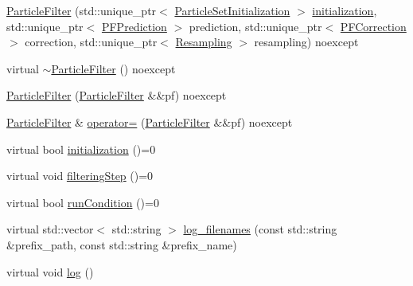 \begin{DoxyCompactItemize}
\item 
\mbox{\hyperlink{classbfl_1_1ParticleFilter_a849f01a7651c350438c31bf364ef59c3}{Particle\+Filter}} (std\+::unique\+\_\+ptr$<$ \mbox{\hyperlink{classbfl_1_1ParticleSetInitialization}{Particle\+Set\+Initialization}} $>$ \mbox{\hyperlink{classbfl_1_1FilteringAlgorithm_adebe2ec2372f97a2a5baecf8c2c2a9c9}{initialization}}, std\+::unique\+\_\+ptr$<$ \mbox{\hyperlink{classbfl_1_1PFPrediction}{P\+F\+Prediction}} $>$ prediction, std\+::unique\+\_\+ptr$<$ \mbox{\hyperlink{classbfl_1_1PFCorrection}{P\+F\+Correction}} $>$ correction, std\+::unique\+\_\+ptr$<$ \mbox{\hyperlink{classbfl_1_1Resampling}{Resampling}} $>$ resampling) noexcept
\item 
virtual \mbox{\hyperlink{classbfl_1_1ParticleFilter_a11dcf55dd8fa9f246c2af2bf6decbaa3}{$\sim$\+Particle\+Filter}} () noexcept
\item 
\mbox{\hyperlink{classbfl_1_1ParticleFilter_a957e97f5ea94684b0b33f7f4511b29e5}{Particle\+Filter}} (\mbox{\hyperlink{classbfl_1_1ParticleFilter}{Particle\+Filter}} \&\&pf) noexcept
\item 
\mbox{\hyperlink{classbfl_1_1ParticleFilter}{Particle\+Filter}} \& \mbox{\hyperlink{classbfl_1_1ParticleFilter_af8a15189f6426c075236dd5e9c9a3107}{operator=}} (\mbox{\hyperlink{classbfl_1_1ParticleFilter}{Particle\+Filter}} \&\&pf) noexcept
\item 
virtual bool \mbox{\hyperlink{classbfl_1_1FilteringAlgorithm_adebe2ec2372f97a2a5baecf8c2c2a9c9}{initialization}} ()=0
\item 
virtual void \mbox{\hyperlink{classbfl_1_1FilteringAlgorithm_ab3bceb43b5810a4bf1da884b8a0b145a}{filtering\+Step}} ()=0
\item 
virtual bool \mbox{\hyperlink{classbfl_1_1FilteringAlgorithm_a5fc12882356f6906b102fbfff2bc4b7c}{run\+Condition}} ()=0
\item 
virtual std\+::vector$<$ std\+::string $>$ \mbox{\hyperlink{classbfl_1_1Logger_a328ceaa8e70e6918f11142b12b8be217}{log\+\_\+filenames}} (const std\+::string \&prefix\+\_\+path, const std\+::string \&prefix\+\_\+name)
\item 
virtual void \mbox{\hyperlink{classbfl_1_1Logger_ad44f46593cb8c4c87c1178eb326e2f64}{log}} ()
\end{DoxyCompactItemize}
